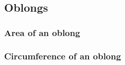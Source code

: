 
\subsection{Oblongs}

\subsubsection{Area of an oblong}

\subsubsection{Circumference of an oblong}


